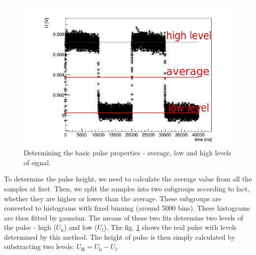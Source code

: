  \begin{figure}[H]
 \centering
 \includegraphics[scale=0.65]{./pictures/PMTPulse}
 \caption{Determining the basic pulse properties - average, low and high levels of signal.}
 \label{pulse}
\end{figure}

To determine the pulse height, we need to calculate the average value from all the samples at first. Then, we split the samples into two subgroups according to fact, whether they are higher or lower than the average. These subgroups are converted to histograms with fixed binning (around 5000 bins). These histograms are then fitted by gaussian. The means of these two fits determine two levels of the pulse - high ($U_\textrm{h}$) and low ($U_\textrm{l}$). The fig. \ref{pulse} shows the real pulse with levels determined by this method. The height of pulse is then simply calculated by substracting two levels: $U_\textrm{H} = U_\textrm{h} - U_\textrm{l}$.

